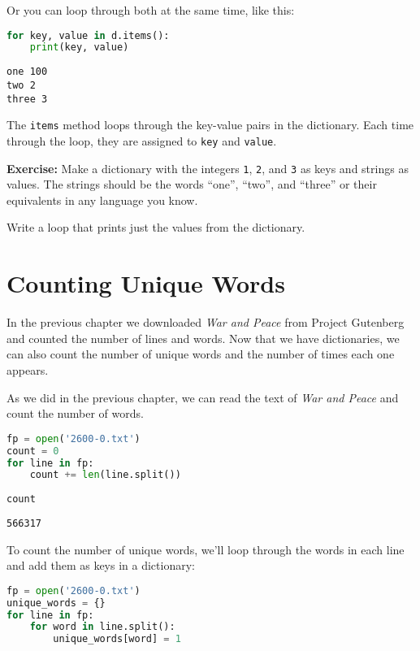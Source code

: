 Or you can loop through both at the same time, like this:

\begin{lstlisting}[language=Python,style=source]
for key, value in d.items():
    print(key, value)
\end{lstlisting}

\begin{lstlisting}[style=output]
one 100
two 2
three 3
\end{lstlisting}

The \passthrough{\lstinline!items!} method loops through the key-value
pairs in the dictionary. Each time through the loop, they are assigned
to \passthrough{\lstinline!key!} and \passthrough{\lstinline!value!}.

\textbf{Exercise:} Make a dictionary with the integers
\passthrough{\lstinline!1!}, \passthrough{\lstinline!2!}, and
\passthrough{\lstinline!3!} as keys and strings as values. The strings
should be the words ``one'', ``two'', and ``three'' or their equivalents
in any language you know.

Write a loop that prints just the values from the dictionary.

\section{Counting Unique Words}\label{counting-unique-words}

In the previous chapter we downloaded \emph{War and Peace} from Project
Gutenberg and counted the number of lines and words. Now that we have
dictionaries, we can also count the number of unique words and the
number of times each one appears.

As we did in the previous chapter, we can read the text of \emph{War and
Peace} and count the number of words.

\begin{lstlisting}[language=Python,style=source]
fp = open('2600-0.txt')
count = 0
for line in fp:
    count += len(line.split())
    
count
\end{lstlisting}

\begin{lstlisting}[style=output]
566317
\end{lstlisting}

To count the number of unique words, we'll loop through the words in
each line and add them as keys in a dictionary:

\begin{lstlisting}[language=Python,style=source]
fp = open('2600-0.txt')
unique_words = {}
for line in fp:
    for word in line.split():
        unique_words[word] = 1
\end{lstlisting}

